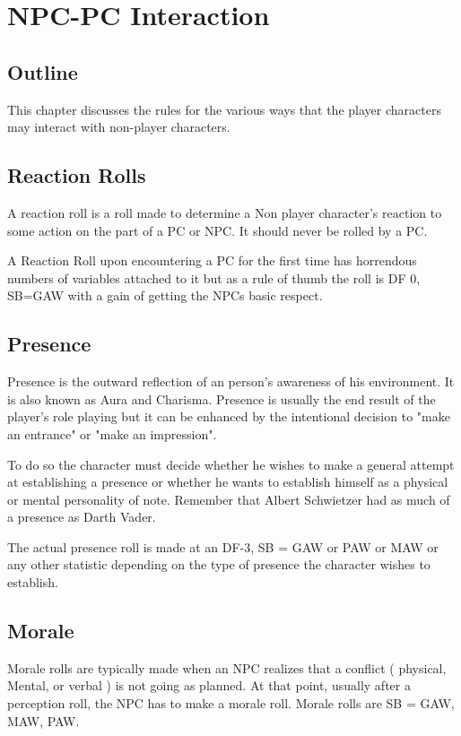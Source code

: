 \chapter{NPC-PC Interaction}

\section{Outline}

This chapter discusses the rules for the various ways that the player 
characters may interact with non-player characters.

\section{Reaction Rolls}

A reaction roll is a roll made to determine a Non player character's 
reaction to some action on the part of a PC or NPC. It should never 
be rolled by a PC.

A Reaction Roll upon encountering a PC for the first time has 
horrendous numbers of variables attached to it but as a rule of thumb 
the roll is DF 0, SB=GAW with a gain of getting the NPCs basic respect.

\section{Presence}

Presence is the outward reflection of an person's awareness of his 
environment. It is also known as Aura and Charisma. Presence is 
usually the end result of the player's role playing but it can be 
enhanced by the intentional decision to "make an entrance" or "make an 
impression".

To do so the character must decide whether he wishes to make a
general attempt at establishing a presence or whether he wants to 
establish himself as a physical or mental personality of note.
Remember that Albert Schwietzer had as much of a presence as Darth
Vader.

The actual presence roll is made at an DF-3, SB = GAW or PAW or MAW or
any other statistic depending on the type of presence the character wishes to establish. 

\section{Morale}

Morale rolls are typically made when an NPC realizes that a conflict 
( physical, Mental, or verbal ) is not going as planned. At that point,
usually after a perception roll, the NPC has to make a morale roll. 
Morale rolls are SB = GAW, MAW, PAW.



